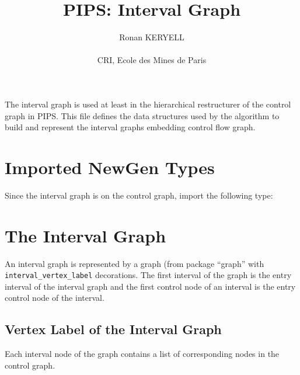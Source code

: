 \documentclass[a4paper]{article}
\title{PIPS: Interval Graph}
\author{Ronan KERYELL\\
\\
    CRI, Ecole des Mines de Paris}
\begin{document}
\maketitle

\sloppy

The interval graph is used at least in the hierarchical restructurer
of the control graph in PIPS. This file defines the data structures
used by the algorithm to build and represent the interval graphs
embedding control flow graph.


\section{Imported NewGen Types}

Since the interval graph is on the control graph, import the following
type:\\
{}

\section{The Interval Graph}

An interval graph is represented by a graph (from package ``graph''
with \verb|interval_vertex_label| decorations. The first interval of the
graph is the entry interval of the interval graph and the first
control node of an interval is the entry control node of the interval.

\subsection{Vertex Label of the Interval Graph}


Each interval node of the graph contains a list of corresponding nodes
in the control graph.

{}
\end{document}
